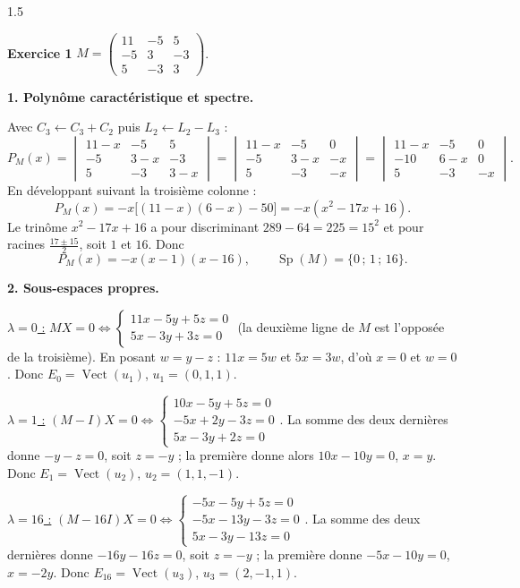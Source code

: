 \documentclass[12pt]{article}
\begin{document}
\begin{spacing}{1.5}

\textbf{Exercice 1} \quad $M=\begin{pmatrix}11&-5&5\\-5&3&-3\\5&-3&3\end{pmatrix}$.

\textbf{1. Polynôme caractéristique et spectre.}

Avec $C_3\leftarrow C_3+C_2$ puis $L_2\leftarrow L_2-L_3$ :
\[
P_M(x)=\begin{vmatrix}11-x&-5&5\\-5&3-x&-3\\5&-3&3-x\end{vmatrix}
=\begin{vmatrix}11-x&-5&0\\-5&3-x&-x\\5&-3&-x\end{vmatrix}
=\begin{vmatrix}11-x&-5&0\\-10&6-x&0\\5&-3&-x\end{vmatrix}.
\]
En développant suivant la troisième colonne :
\[
P_M(x)=-x\big[(11-x)(6-x)-50\big]=-x(x^2-17x+16).
\]
Le trinôme $x^2-17x+16$ a pour discriminant $289-64=225=15^2$ et pour racines $\frac{17\pm15}{2}$, soit $1$ et $16$. Donc
\[
\boxed{P_M(x)=-x(x-1)(x-16)},\qquad\boxed{\operatorname{Sp}(M)=\{0\,;\,1\,;\,16\}}.
\]

\textbf{2. Sous-espaces propres.}

\underline{$\lambda=0$ :} $MX=0\iff\begin{cases}11x-5y+5z=0\\5x-3y+3z=0\end{cases}$ (la deuxième ligne de $M$ est l'opposée de la troisième). En posant $w=y-z$ : $11x=5w$ et $5x=3w$, d'où $x=0$ et $w=0$. Donc $E_0=\operatorname{Vect}(u_1)$, $u_1=(0,1,1)$.

\underline{$\lambda=1$ :} $(M-I)X=0\iff\begin{cases}10x-5y+5z=0\\-5x+2y-3z=0\\5x-3y+2z=0\end{cases}$. La somme des deux dernières donne $-y-z=0$, soit $z=-y$ ; la première donne alors $10x-10y=0$, $x=y$. Donc $E_1=\operatorname{Vect}(u_2)$, $u_2=(1,1,-1)$.

\underline{$\lambda=16$ :} $(M-16I)X=0\iff\begin{cases}-5x-5y+5z=0\\-5x-13y-3z=0\\5x-3y-13z=0\end{cases}$. La somme des deux dernières donne $-16y-16z=0$, soit $z=-y$ ; la première donne $-5x-10y=0$, $x=-2y$. Donc $E_{16}=\operatorname{Vect}(u_3)$, $u_3=(2,-1,1)$.


\end{spacing}
\end{document}
